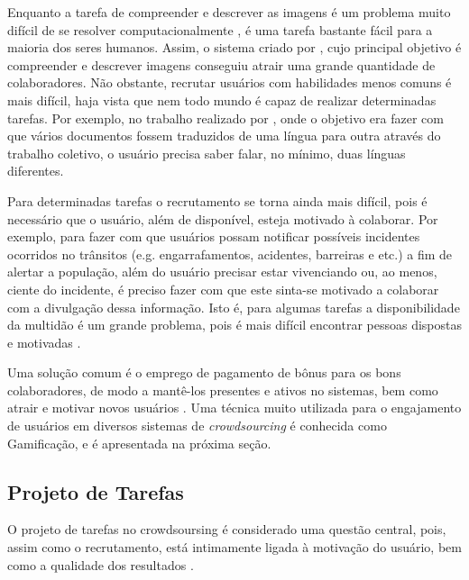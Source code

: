 Enquanto a tarefa de compreender e descrever as imagens é um problema muito difícil de se resolver computacionalmente  \citep{Von2004}, é uma tarefa bastante fácil para a maioria dos seres humanos. Assim, o sistema criado por  \cite{Von2004}, cujo principal objetivo é compreender e descrever imagens conseguiu atrair uma grande quantidade de colaboradores. Não obstante, recrutar usuários com habilidades menos comuns é mais difícil, haja vista que nem todo mundo é capaz de realizar determinadas tarefas. Por exemplo, no trabalho realizado por \cite{Zaidan2011} , onde o objetivo era fazer com que vários documentos fossem traduzidos de uma língua para outra através do trabalho coletivo, o usuário precisa saber  falar, no mínimo, duas línguas diferentes.

Para determinadas tarefas o recrutamento se torna ainda mais difícil, pois é necessário que o usuário, além de disponível, esteja motivado à colaborar. Por exemplo,  para fazer com que usuários possam notificar possíveis incidentes ocorridos no trânsitos (e.g. engarrafamentos, acidentes, barreiras e etc.) a fim de alertar a população, além do usuário precisar estar vivenciando ou, ao menos, ciente do incidente, é preciso fazer com que este sinta-se motivado a colaborar com a divulgação dessa informação.  Isto é, para algumas tarefas a disponibilidade da multidão é um grande problema, pois é mais difícil encontrar pessoas dispostas e motivadas \citep{Hu2012}. 

Uma solução comum é o emprego de pagamento de bônus para os bons colaboradores, de modo a mantê-los presentes e ativos no sistemas, bem como atrair e motivar novos usuários \citep{Hu2012}. Uma técnica muito utilizada para o engajamento de usuários em diversos sistemas de \textit{crowdsourcing} é conhecida como Gamificação, e é apresentada na próxima seção.   


\subsection{Projeto de Tarefas}
O projeto  de tarefas no crowdsoursing é considerado uma questão central, pois, assim como o recrutamento, está intimamente ligada à motivação do usuário, bem como a qualidade dos resultados \citep{Hu2012}. 

